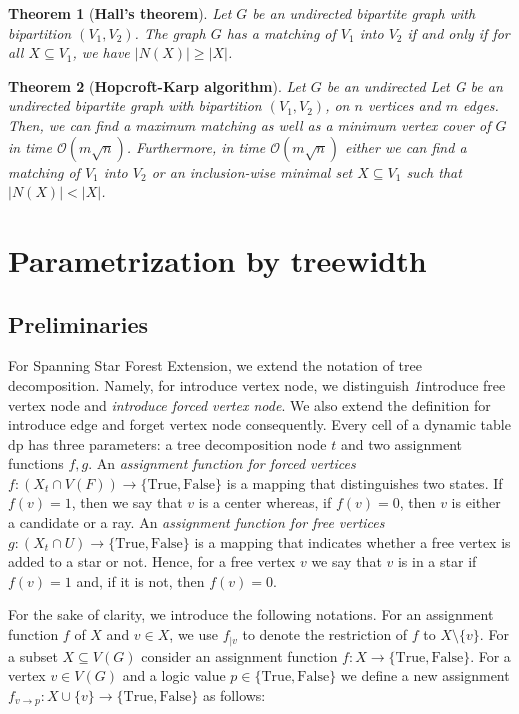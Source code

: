 \documentclass[en]{pracamgr}
\newtheorem{theorem}{Theorem}
\theoremstyle{definition}
\newcommand{\ssfep}{{\sc Spanning Star Forest Extension}}
\newcommand{\true}{\textrm{True}}
\newcommand{\false}{\textrm{False}}
\begin{document}
\begin{theorem}[\textbf{Hall's theorem}]
	Let $G$ be an undirected bipartite graph with bipartition $(V_1,V_2)$. The graph $G$ has a matching of $V_1$ into $V_2$ if and only if for all $X \subseteq V_1$, we have $|N(X)| \geq |X|$.
\end{theorem}

\begin{theorem}[\textbf{Hopcroft-Karp algorithm}]
	Let $G$ be an undirected Let G be an undirected bipartite graph with bipartition $(V_1,V_2)$, on $n$ vertices and $m$ edges.	Then, we can find a maximum matching as well as a minimum vertex cover of $G$ in time $\mathcal{O}(m\sqrt{n})$. Furthermore, in time $\mathcal{O}(m\sqrt{n})$ either we can find a matching of $V_1$ into $V_2$ or an inclusion-wise minimal set $X \subseteq V_1$ such that $|N(X)| < |X|$.
\end{theorem}



\section{Parametrization by treewidth}

\subsection{Preliminaries}

For \ssfep{}, we extend the notation of tree decomposition. Namely, for introduce vertex node, we distinguish \textit1{introduce free vertex node} and \textit{introduce forced vertex node}. We also extend the definition for introduce edge and forget vertex node consequently. Every cell of a dynamic table $\text{dp}$ has three parameters: a tree decomposition node $t$ and two assignment functions $f,g$. An \textit{assignment function for forced vertices} $f: (X_t \cap V(F)) \rightarrow \{\true, \false\}$ is a mapping that distinguishes two states. If $f(v)=1$, then we say that $v$ is a center whereas, if $f(v)=0$, then $v$ is either a candidate or a ray. An \textit{assignment function for free vertices} $g: (X_t \cap U) \rightarrow \{\true, \false\}$ is a mapping that indicates whether a free vertex is added to a star or not. Hence, for a free vertex $v$ we say that $v$ is in a star if $f(v)=1$ and, if it is not, then $f(v)=0$.

For the sake of clarity, we introduce the following notations. For an assignment function $f$ of $X$ and $v \in X$, we use $f_{|v}$ to denote the restriction of $f$ to $X \setminus \{v\}$. For a subset $X \subseteq V(G)$ consider an assignment function $f:X \rightarrow \{\true,\false\}$. For a vertex $v \in V(G)$ and a logic value $p \in \{\true, \false\}$ we define a new assignment $f_{v \rightarrow p}: X \cup \{v\} \rightarrow \{\true, \false\}$ as follows:
\end{document}

